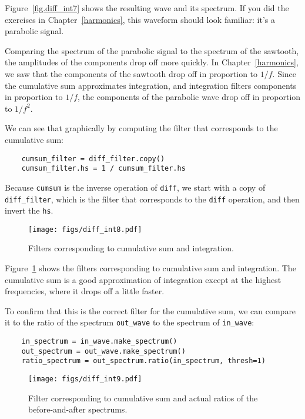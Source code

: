 Figure~\ref{fig.diff_int7} shows the resulting wave and its spectrum.
If you did the exercises in Chapter~\ref{harmonics}, this waveform should
look familiar: it's a parabolic signal.

Comparing the spectrum of the parabolic signal to the spectrum of the
sawtooth, the amplitudes of the components drop off more quickly.  In
Chapter~\ref{harmonics}, we saw that the components of the sawtooth
drop off in proportion to $1/f$.  Since the cumulative sum
approximates integration, and integration filters components in
proportion to $1/f$, the components of the parabolic wave drop off in
proportion to $1/f^2$.

We can see that graphically by computing the filter that corresponds
to the cumulative sum:

\begin{verbatim}
	cumsum_filter = diff_filter.copy()
	cumsum_filter.hs = 1 / cumsum_filter.hs
\end{verbatim}

Because {\tt cumsum} is the inverse operation of {\tt diff}, we
start with a copy of \verb"diff_filter", which is the filter
that corresponds to the {\tt diff} operation, and then invert the
{\tt hs}.

\begin{figure}
	\centerline{\texttt{[image: figs/diff\_int8.pdf]}}
	\caption{Filters corresponding to cumulative sum and integration.}
	\label{fig.diff_int8}
\end{figure}

Figure~\ref{fig.diff_int8} shows the filters corresponding to
cumulative sum and integration.  The cumulative sum is a good
approximation of integration except at the highest frequencies,
where it drops off a little faster.

To confirm that this is the correct filter for the cumulative
sum, we can compare it to the ratio of the spectrum
\verb"out_wave" to the spectrum of \verb"in_wave":

\begin{verbatim}
	in_spectrum = in_wave.make_spectrum()
	out_spectrum = out_wave.make_spectrum()
	ratio_spectrum = out_spectrum.ratio(in_spectrum, thresh=1)
\end{verbatim}

\begin{figure}
	\centerline{\texttt{[image: figs/diff\_int9.pdf]}}
	\caption{Filter corresponding to cumulative sum and actual ratios of
		the before-and-after spectrums.}
	\label{fig.diff_int9}
\end{figure}

